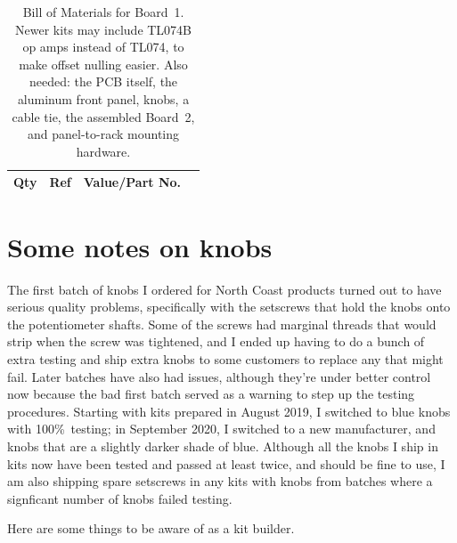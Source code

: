 \begin{table}
{\centering
{}
\vspace{\baselineskip}

\begin{tabular}{rp{1.3in}cp{3in}}
  \textbf{Qty} & \textbf{Ref} & \textbf{Value/Part No.} & \\ \hline

\end{tabular}\par}
\caption{Bill of Materials for Board~1.  Newer kits may include TL074B
op amps instead of TL074, to make offset nulling easier.  Also needed:
the PCB itself, the aluminum front panel, knobs, a cable tie,
the assembled Board~2, and panel-to-rack mounting hardware.}\label{tab:b1bom}
\end{table}

\section{Some notes on knobs}

The first batch of knobs I ordered for North Coast products turned out to
have serious quality problems, specifically with the setscrews that hold the
knobs onto the potentiometer shafts.  Some of the screws had marginal
threads that would strip when the screw was tightened, and I ended up having
to do a bunch of extra testing and ship extra knobs to some customers to
replace any that might fail.  Later batches have also had issues, although
they're under better control now because the bad first batch served as a
warning to step up the testing procedures.  Starting with kits prepared in
August 2019, I switched to blue knobs with 100\%\ testing; in September
2020, I switched to a new manufacturer, and knobs that are a slightly darker
shade of blue.  Although all the knobs I ship in kits now have been tested
and passed at least twice, and should be fine to use, I am also shipping
spare setscrews in any kits with knobs from batches where a signficant
number of knobs failed testing.

Here are some things to be aware of as a kit builder.

